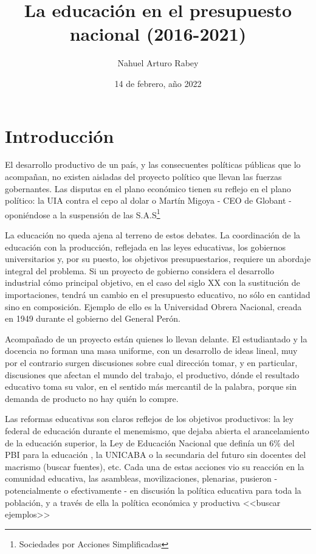 \documentclass[12pt]{article}
\title{
    La educación en el presupuesto nacional (2016-2021)
}
\author{Nahuel Arturo Rabey}
\date{14 de febrero, año 2022}
\begin{document}
\begin{titlepage}
    \maketitle
\end{titlepage}

\section{Introducción}

El desarrollo productivo de un país, y las consecuentes políticas públicas que lo acompañan, no existen aisladas del proyecto político que llevan las fuerzas gobernantes. Las disputas en el plano económico tienen su reflejo en el plano político: la UIA contra el cepo al dolar \cite{tisalta} o Martín Migoya - CEO de Globant - oponiéndose a la suspensión de las S.A.S\footnote{Sociedades por Acciones Simplificadas} \cite{globant}

La educación no queda ajena al terreno de estos debates. La coordinación de la educación con la producción, reflejada en las leyes educativas, los gobiernos universitarios y, por su puesto, los objetivos presupuestarios, requiere un abordaje integral del problema. Si un proyecto de gobierno considera el desarrollo industrial cómo principal objetivo, en el caso del siglo XX con la sustitución de importaciones, tendrá un cambio en el presupuesto educativo, no sólo en cantidad sino en composición. Ejemplo de ello es la Universidad Obrera Nacional, creada en 1949 durante el gobierno del General Perón.

Acompañado de un proyecto están quienes lo llevan delante. El estudiantado y la docencia no forman una masa uniforme, con un desarrollo de ideas lineal, muy por el contrario surgen discusiones sobre cual dirección tomar, y en particular, discusiones que afectan el mundo del trabajo, el productivo, dónde el resultado educativo toma su valor, en el sentido más mercantil de la palabra, porque sin demanda de producto no hay quién lo compre.

Las reformas educativas son claros reflejos de los objetivos productivos: la ley federal de educación durante el menemismo, que dejaba abierta el arancelamiento de la educación superior, la Ley de Educación Nacional que definía un 6\% del PBI para la educación \cite{cipec}, la UNICABA o la secundaria del futuro sin docentes del macrismo (buscar fuentes), etc. Cada una de estas acciones vio su reacción en la comunidad educativa, las asambleas, movilizaciones, plenarias, pusieron - potencialmente o efectivamente - en discusión la política educativa para toda la población, y a través de ella la política económica y productiva <<buscar ejemplos>>
\end{document}
